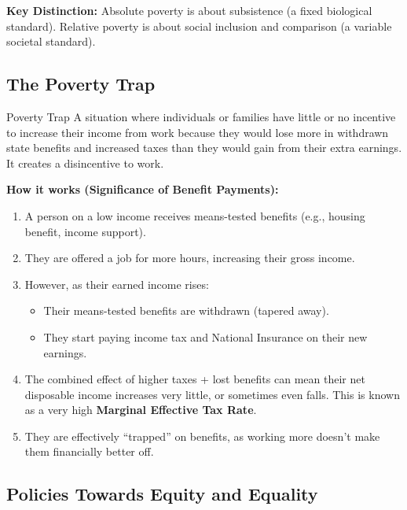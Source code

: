 \documentclass[11pt, a4paper, twoside]{book}
\begin{document}
\begin{coreidea}
\textbf{Key Distinction:} Absolute poverty is about subsistence (a fixed biological standard). Relative poverty is about social inclusion and comparison (a variable societal standard).
\end{coreidea}

\subsection{The Poverty Trap}

\begin{keyterm}{Poverty Trap}
A situation where individuals or families have little or no incentive to increase their income from work because they would lose more in withdrawn state benefits and increased taxes than they would gain from their extra earnings. It creates a disincentive to work.
\end{keyterm}

\textbf{How it works (Significance of Benefit Payments):}

\begin{enumerate}
  \item A person on a low income receives means-tested benefits (e.g., housing benefit, income support).
  \item They are offered a job for more hours, increasing their gross income.
  \item However, as their earned income rises:
  \begin{itemize}
    \item Their means-tested benefits are withdrawn (tapered away).
    \item They start paying income tax and National Insurance on their new earnings.
  \end{itemize}
  \item The combined effect of higher taxes + lost benefits can mean their net disposable income increases very little, or sometimes even falls. This is known as a very high \textbf{Marginal Effective Tax Rate}.
  \item They are effectively ``trapped'' on benefits, as working more doesn't make them financially better off.
\end{enumerate}

\subsection{Policies Towards Equity and Equality}
\end{document}
